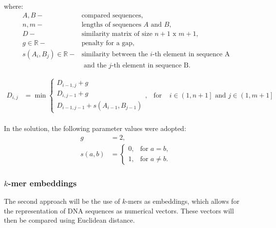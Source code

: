 \documentclass[pdflatex,sn-vancouver-num]{sn-jnl}%
\begin{document}
                where:
                \begin{align*}
                    A, B -& \text{compared sequences}, \\
                    n, m -& \text{lengths of sequences } A \text{ and } B, \\
                    D -& \text{similarity matrix of size } n + 1 \text{ x } m + 1, \\
                    g \in \mathbb{R} -& \text{penalty for a gap}, \\
                    s(A_i, B_j) \in \mathbb{R} -& \text{similarity between the } i\text{-th element in sequence A} \\ 
                                                & \text{ and the } j\text{-th element in sequence B}.
                \end{align*}

                \begin{equation}
                    \begin{aligned}
                        D_{i,j} &= \min
                        \begin{cases}
                        D_{i - 1, j} + g \\
                        D_{i, j - 1} + g \\
                        D_{i - 1, j - 1} + s(A_{i - 1}, B_{j - 1})
                        \end{cases}, & \text{for } & i \in \left(1, n + 1\right] \text{ and } j \in \left(1, m + 1\right] \\
                    \end{aligned}
                    \label{Equation:NeedlemanWunschModified}
                \end{equation}

                In the solution, the following parameter values were adopted:
                \begin{align*}
                    g &= 2, \\
                    s(a, b) &= \begin{cases}
                        0, & \text{for } a = b, \\
                        1, & \text{for } a \neq b.
                    \end{cases}
                \end{align*}

            \subsubsection{$k$-mer embeddings}
                The second approach will be the use of $k$-mers as embeddings, which allows for the representation of DNA sequences as numerical vectors. These vectors will then be compared using Euclidean distance.
                
\end{document}
